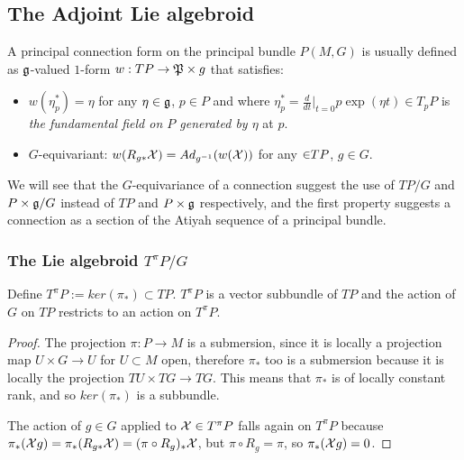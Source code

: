 \subsection{The Adjoint Lie algebroid}

A principal connection form on the principal bundle $P(M, G)$ is usually defined as $\mathfrak{g}$-valued $1$-form  $w: TP \to \mathfrak{P} \times g$ that satisfies:

    \begin{itemize}
    
    \item $w(\eta_p^*) = \eta$ for any $\eta \in \mathfrak{g}$, $p \in P$ and where $\eta_p^* = \frac{d}{dt}\bigr|_{t = 0} p\exp(\eta t)\in T_p P$ is \emph{the fundamental field on $P$ generated by $\eta$} at $p$.
    
    \item $G$-equivariant: $w(R_{g*} \mathcal{X}) = Ad_{g^{-1}}( w(\mathcal{X}))$ for any $\mathcal{\in} TP$, $g \in G$.
    
    \end{itemize}

We will see that the $G$-equivariance of a connection suggest the use of $TP/G$ and $P \times \mathfrak{g} / G$ instead of $TP$ and $P \times \mathfrak{g}$ respectively, and the first property suggests a connection as a section of the Atiyah sequence of a principal bundle. 

\subsubsection{The Lie algebroid $T^\pi P/G$}

\begin{lemma}
Define $T^\pi P := ker(\pi_*) \subset TP$. $T^\pi P$ is a vector subbundle of $TP$ and the action of $G$ on $TP$ restricts to an action on $T^\pi P$.
\end{lemma}

\begin{proof}
The projection $\pi:P \to M$ is a submersion, since it is locally a projection map $U \times G \to U$ for $U \subset M$ open, therefore $\pi_*$ too is a submersion because it is locally the projection $TU \times TG \to TG$. This means that $\pi_*$ is of locally constant rank, and so $ker(\pi_*)$ is a subbundle.

The action of $g \in G$ applied to $\mathcal{X} \in T^\pi P$ falls again on $T^\pi P$ because $\pi_*(\mathcal{X}g) = \pi_*(R_{g*} \mathcal{X}) = (\pi \circ R_g)_* \mathcal{X}$, but $\pi \circ R_g = \pi$, so $\pi_*(\mathcal{X}g) = 0$.
\end{proof}


